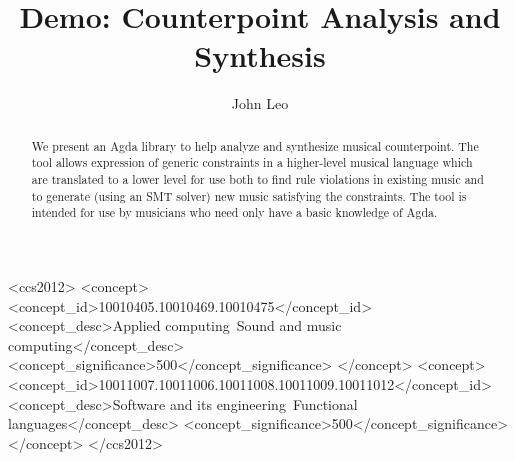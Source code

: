 \documentclass[sigplan,screen]{acmart}
\begin{document}
\title{Demo: Counterpoint Analysis and Synthesis}


\author{John Leo}


\begin{abstract}
We present an Agda library to help analyze
and synthesize musical counterpoint. The tool allows expression of
generic constraints in a higher-level musical language which are
translated to a lower level for use both to find rule violations in
existing music and to generate (using an SMT solver) new
music satisfying the constraints. The tool is intended for use by
musicians who need only have a basic knowledge of Agda.
\end{abstract}


\begin{CCSXML}
<ccs2012>
<concept>
<concept_id>10010405.10010469.10010475</concept_id>
<concept_desc>Applied computing~Sound and music computing</concept_desc>
<concept_significance>500</concept_significance>
</concept>
<concept>
<concept_id>10011007.10011006.10011008.10011009.10011012</concept_id>
<concept_desc>Software and its engineering~Functional languages</concept_desc>
<concept_significance>500</concept_significance>
</concept>
</ccs2012>
\end{CCSXML}




\maketitle
\end{document}
